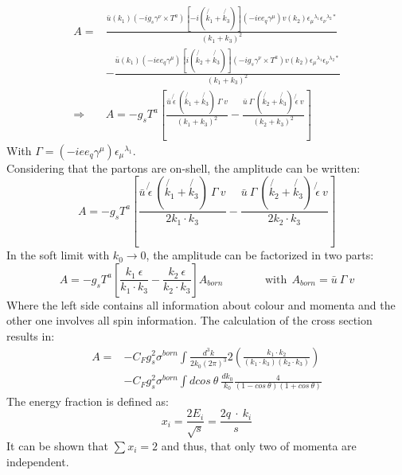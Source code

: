 \begin{equation}
\begin{split}
A = & \frac{\bar{u}(k_1)(-ig_s\gamma^{\nu}\times T^a)[-i(\not{k_1}+\not{k_3})](-iee_q \gamma^{\mu})v(k_2){\epsilon_{\mu}}^{\lambda_1}{\epsilon_{\nu}}^{\lambda_2*}}{(k_1 + k_3)^2}\\ 
&- \frac{\bar{u}(k_1)(-iee_q \gamma^{\mu})[i(\not{k_2}+\not{k_3})](-ig_s\gamma^{\nu}\times T^a)v(k_2){\epsilon_{\mu}}^{\lambda_1}{\epsilon_{\nu}}^{\lambda_2*}}{(k_1 + k_3)^2}\\
\Rightarrow &A=-g_s T^a[ \frac{\bar{u}\:\not{\epsilon}\:(\not{k_1}+\not{k_3})\:\Gamma \:v}{(k_1 + k_3)^2} - \frac{\bar{u}\:\Gamma\:(\not{k_2}+\not{k_3})\:\not{\epsilon} \:v}{(k_2 + k_3)^2}]
\end{split}
\end{equation}
With $\Gamma=(-iee_q \gamma^{\mu}){\epsilon_{\mu}}^{\lambda_1}$.\\
Considering that the partons are on-shell, the amplitude can be written:
\begin{equation}
 A=-g_s T^a[ \frac{\bar{u}\:\not{\epsilon}\:(\not{k_1}+\not{k_3})\:\Gamma \:v}{2k_1 \cdot k_3} - \frac{\bar{u}\:\Gamma\:(\not{k_2}+\not{k_3})\:\not{\epsilon} \:v}{2k_2 \cdot k_3}]
\end{equation}
In the soft limit with $k_0 \rightarrow 0$, the amplitude can be factorized in two parts:
\begin{equation}
 A=-g_s T^a[ \frac{k_1\:{\epsilon}}{k_1 \cdot k_3} - \frac{k_2\:{\epsilon}}{k_2 \cdot k_3}] A_{born} \:\:\:\:\:\:\:\:\:\:\:\:\:\:\:\:\:\text{with}\:\: A_{born}= \bar{u}\: \Gamma \:v
\end{equation}
Where the left side contains all information about colour and momenta and the other one involves all spin information.
The calculation of the cross section results in:
\begin{equation}
\begin{split}
A=&-C_F g_s^2 \sigma^{born} \int \frac{d^3 k}{2k_0 (2{\pi})^3} 2(\frac{k_1 \cdot k_2}{(k_1 \cdot k_3)(k_2 \cdot k_3)})\\ 
&-C_F g_s^2 \sigma^{born} \int dcos\: \theta\: \frac{d k_0}{k_0} \frac{4}{(1-cos\: \theta)(1+cos\: \theta)}
\end{split}
\end{equation}
The energy fraction is defined as:
\begin{equation}
x_i = \frac{2E_i}{\sqrt{s}}=\frac{2q\: \cdot\: k_i}{s}
\end{equation}
It can be shown that $ \sum x_i =2  $ and thus, that only two of momenta are independent.


